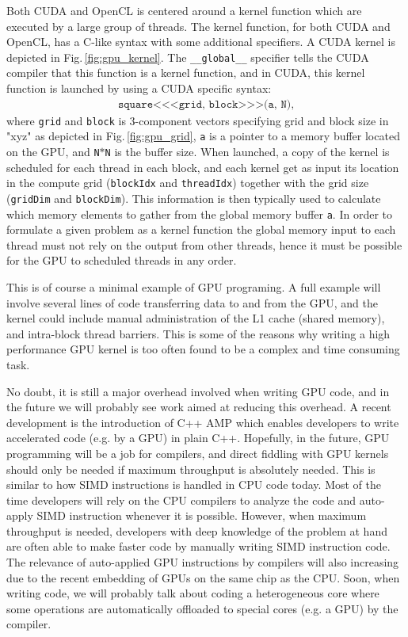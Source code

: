Both CUDA and OpenCL is centered around a kernel function which are executed by a large group of threads. The kernel function, for both CUDA and OpenCL, has a C-like syntax with some additional specifiers. A CUDA kernel is depicted in Fig.\,\ref{fig:gpu_kernel}. The \texttt{\_\_global\_\_} specifier tells the CUDA compiler that this function is a kernel function, and in CUDA, this kernel function is launched by using a CUDA specific syntax:
\begin{align*}
\texttt{square<<<grid, block>>>(a, N)},
\end{align*}
where \texttt{grid} and \texttt{block} is 3-component vectors specifying grid and block size in "xyz" as depicted in Fig.\,\ref{fig:gpu_grid}, \texttt{a} is a pointer to a memory buffer located on the GPU, and \texttt{N}$*$\texttt{N} is the buffer size. When launched, a copy of the kernel is scheduled  for each thread in each block, and each kernel get as input its location in the compute grid (\texttt{blockIdx} and \texttt{threadIdx}) together with the grid size (\texttt{gridDim} and \texttt{blockDim}). This information is then typically used to calculate which memory elements to gather from the global memory buffer \texttt{a}. In order to formulate a given problem as a kernel function the global memory input to each thread must not rely on the output from other threads, hence it must be possible for the GPU to scheduled threads in any order. 

This is of course a minimal example of GPU programing. A full example will involve several lines of code transferring data to and from the GPU, and the kernel could include manual administration of the L1 cache (shared memory), and intra-block thread barriers. This is some of the reasons why writing a high performance GPU kernel is too often found to be a complex and time consuming task. 

No doubt, it is still a major overhead involved when writing GPU code, and in the future we will probably see work aimed at reducing this overhead.  A recent development is the introduction of C++ AMP which enables developers to write accelerated code (e.g. by a GPU) in plain C++. Hopefully, in the future, GPU programming will be a job for compilers, and direct fiddling with GPU kernels should only be needed if maximum throughput is absolutely needed. This is similar to how SIMD instructions is handled in CPU code today. Most of the time developers will rely on the CPU compilers to analyze the code and auto-apply SIMD instruction whenever it is possible. However, when maximum throughput is needed, developers with deep knowledge of the problem at hand are often able to make faster code by manually writing SIMD instruction code. The relevance of auto-applied GPU instructions by compilers will also increasing due to the recent embedding of GPUs on the same chip as the CPU. Soon, when writing code, we will probably talk about coding a heterogeneous core where some operations are automatically offloaded to special cores (e.g. a GPU) by the compiler.

